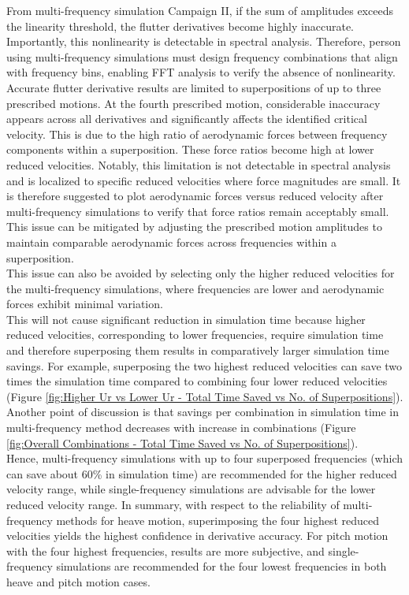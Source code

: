 \documentclass[../main]{subfiles}
\begin{document}
From multi-frequency simulation Campaign II, if the sum of amplitudes exceeds the linearity threshold, the flutter derivatives 
become highly inaccurate.
Importantly, this nonlinearity is detectable in spectral analysis. Therefore, person using 
multi-frequency simulations must design frequency combinations that align with frequency bins, enabling FFT analysis 
to verify the absence of nonlinearity. \\

Accurate flutter derivative results are limited to superpositions of up to three prescribed motions.
At the fourth prescribed motion, considerable inaccuracy appears across all derivatives and significantly affects the identified critical velocity.
This is due to the high ratio of aerodynamic forces between frequency components within a superposition.
These force ratios become high at lower reduced velocities. Notably, this limitation is not detectable in spectral 
analysis and is localized to specific reduced velocities where force magnitudes are small.
It is therefore suggested to plot aerodynamic forces versus reduced velocity after multi-frequency simulations to verify that force ratios remain acceptably small.
This issue can be mitigated by adjusting the prescribed motion amplitudes to maintain comparable aerodynamic forces across frequencies within a superposition.\\
This issue can also be avoided by selecting only the higher reduced velocities for the multi-frequency simulations, where frequencies are lower and aerodynamic 
forces exhibit minimal variation. \\ 

This will not cause significant reduction in simulation time because 
higher reduced velocities, corresponding to lower frequencies, require simulation time and therefore 
superposing them results in comparatively larger simulation time savings.
For example, superposing the two highest reduced velocities can save two times the simulation time compared to combining four lower reduced velocities (Figure \ref{fig:Higher Ur vs Lower Ur - Total Time Saved vs No. of Superpositions}).
Another point of discussion is that savings per combination in simulation time in multi-frequency method decreases with increase in combinations (Figure \ref{fig:Overall Combinations - Total Time Saved vs No. of Superpositions}). \\

Hence, multi-frequency simulations with up to four superposed frequencies (which can save about 60\% in simulation time) are recommended for the higher reduced velocity 
range, while single-frequency simulations are advisable for the lower reduced velocity range.
In summary, with respect to the reliability of multi-frequency methods for heave motion, superimposing the four highest reduced 
velocities yields the highest confidence in derivative accuracy.
For pitch motion with the four highest frequencies, results 
are more subjective, and single-frequency simulations are recommended for the four lowest frequencies in both heave and pitch 
motion cases.
\end{document}
